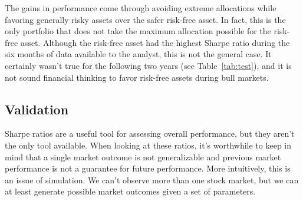 \documentclass[a4paper]{article}\usepackage[]{graphicx}\usepackage[]{color}
\begin{document}
The gains in performance come through avoiding extreme allocations while favoring generally risky assets over the safer risk-free asset. In fact, this is the only portfolio that does not take the maximum allocation possible for the risk-free asset. Although the risk-free asset had the highest Sharpe ratio during the six months of data available to the analyst, this is not the general case. It certainly wasn't true for the following two years (see Table~\ref{tab:test}), and it is not sound financial thinking to favor risk-free assets during bull markets.

\begin{table}
    \centering
    \caption{Expected returns, standard deviations and Sharpe ratios for the candidate assets for the various portfolios over the test period. The data used for estimating these statistics cover 01-09-2012 to 12-30-2013.}
    \label{tab:test}
\end{table}

\subsection{Validation}

Sharpe ratios are a useful tool for assessing overall performance, but they aren't the only tool available. When looking at these ratios, it's worthwhile to keep in mind that a single market outcome is not generalizable and previous market performance is not a guarantee for future performance. More intuitively, this is an issue of simulation. We can't observe more than one stock market, but we can at least generate possible market outcomes given a set of parameters.
\end{document}
